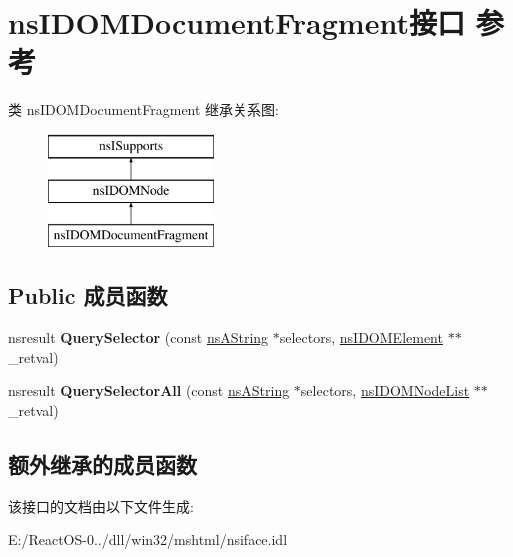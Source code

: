 \hypertarget{interfacens_i_d_o_m_document_fragment}{}\section{ns\+I\+D\+O\+M\+Document\+Fragment接口 参考}
\label{interfacens_i_d_o_m_document_fragment}
类 ns\+I\+D\+O\+M\+Document\+Fragment 继承关系图\+:\begin{figure}[H]
\begin{center}
\leavevmode
\includegraphics[height=3.000000cm]{interfacens_i_d_o_m_document_fragment}
\end{center}
\end{figure}
\subsection*{Public 成员函数}
\begin{DoxyCompactItemize}
\item 
\mbox{\label{interfacens_i_d_o_m_document_fragment_a2943e2aed71d0c0647d9bbe623ea245f}} 
nsresult {\bfseries Query\+Selector} (const \hyperlink{structns_string_container}{ns\+A\+String} $\ast$selectors, \hyperlink{interfacens_i_d_o_m_element}{ns\+I\+D\+O\+M\+Element} $\ast$$\ast$\+\_\+retval)
\item 
\mbox{\label{interfacens_i_d_o_m_document_fragment_ac045af687a70158dfe078c2d032cd287}} 
nsresult {\bfseries Query\+Selector\+All} (const \hyperlink{structns_string_container}{ns\+A\+String} $\ast$selectors, \hyperlink{interfacens_i_d_o_m_node_list}{ns\+I\+D\+O\+M\+Node\+List} $\ast$$\ast$\+\_\+retval)
\end{DoxyCompactItemize}
\subsection*{额外继承的成员函数}


该接口的文档由以下文件生成\+:\begin{DoxyCompactItemize}
\item 
E\+:/\+React\+O\+S-\/0../dll/win32/mshtml/nsiface.\+idl\end{DoxyCompactItemize}
